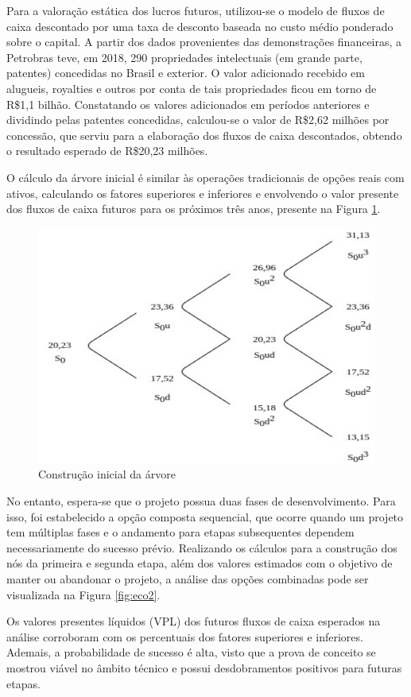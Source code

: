 Para a valoração estática dos lucros futuros, utilizou-se o modelo de fluxos de caixa descontado por uma taxa de desconto baseada no custo médio ponderado sobre o capital. A partir dos dados provenientes das demonstrações financeiras, a Petrobras teve, em 2018, 290 propriedades intelectuais (em grande parte, patentes) concedidas no Brasil e exterior. O valor adicionado recebido em alugueis, royalties e outros por conta de tais propriedades ficou em torno de R\$1,1 bilhão. Constatando os valores adicionados em períodos anteriores e dividindo pelas patentes concedidas, calculou-se o valor de R\$2,62 milhões por concessão, que serviu para a elaboração dos fluxos de caixa descontados, obtendo o resultado esperado de R\$20,23 milhões. 

O cálculo da árvore inicial é similar às operações tradicionais de opções reais com ativos, calculando os fatores superiores e inferiores e envolvendo o valor presente dos fluxos de caixa futuros para os próximos três anos, presente na Figura \ref{fig:eco1}.

\begin{figure}
	\centering
	\includegraphics[width=.75\textwidth]{images/eco1.pdf}
	\caption{Construção inicial da árvore}
	\label{fig:eco1}
\end{figure}

No entanto, espera-se que o projeto possua duas fases de desenvolvimento. Para isso, foi estabelecido a opção composta sequencial, que ocorre quando um projeto tem múltiplas fases e o andamento para etapas subsequentes dependem necessariamente do sucesso prévio. Realizando os cálculos para a construção dos nós da primeira e segunda etapa, além dos valores estimados com o objetivo de manter ou abandonar o projeto, a análise das opções combinadas pode ser visualizada na Figura \ref{fig:eco2}. 

Os valores presentes líquidos (VPL) dos futuros fluxos de caixa esperados na análise corroboram com os percentuais dos fatores superiores e inferiores. Ademais, a probabilidade de sucesso é alta, visto que a prova de conceito se mostrou viável no âmbito técnico e possui desdobramentos positivos para futuras etapas.

